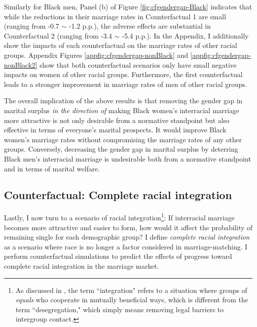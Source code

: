 Similarly for Black men, Panel (b) of Figure \ref{fig:cfgendergap-Black} indicates that while the reductions in their marriage rates in Counterfactual 1 are small (ranging from -0.7 $\sim$ -1.2 p.p.), the adverse effects are substantial in Counterfactual 2 (ranging from -3.4 $\sim$ -5.4 p.p.). In the Appendix, I additionally show the impacts of each counterfactual on the marriage rates of other racial groups. Appendix Figures \ref{appfig:cfgendergap-nonBlack} and \ref{appfig:cfgendergap-nonBlack2} show that both counterfactual scenarios only have small negative impacts on women of other racial groups. Furthermore, the first counterfactual leads to a stronger improvement in marriage rates of men of other racial groups. 

The overall implication of the above results is that removing the gender gap in marital surplus \textit{in the direction of} making Black women's interracial marriage more attractive is not only desirable from a normative standpoint but also effective in terms of everyone's marital prospects. It would improve Black women's marriage rates without compromising the marriage rates of any other groups. Conversely, decreasing the gender gap in marital surplus by deterring Black men's interracial marriage is undesirable both from a normative standpoint and in terms of marital welfare.


\subsection{Counterfactual: Complete racial integration}

Lastly, I now turn to a scenario of racial integration\footnote{As discussed in \cite{oflaherty_book_2015}, the term ``integration" refers to a situation where groups of \textit{equals} who cooperate in mutually beneficial ways, which is different from the term ``desegregation," which simply means removing legal barriers to intergroup contact.}: If interracial marriage becomes more attractive and easier to form, how would it affect the probability of remaining single for each demographic group? I define \textit{complete racial integration} as a scenario where race is no longer a factor considered in marriage-matching. I perform counterfactual simulations to predict the effects of progress toward complete racial integration in the marriage market. 

